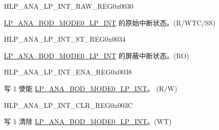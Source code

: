 \begin{register}{H}{LP\_ANA\_LP\_INT\_RAW\_REG}{0x0030}\label{regdesc:LPANALPINTRAWREG}
%
%
\regnewline%
\begin{regdesc}\begin{reglist}
\label{fielddesc:LPANABODMODE0LPINTRAW}\item [LP\_ANA\_BOD\_MODE0\_LP\_INT\_RAW] \hyperref[int:LPANABODMODE0LPINT]{LP\_ANA\_BOD\_MODE0\_LP\_INT} 的原始中断状态。(R/WTC/SS)
\end{reglist}\end{regdesc}
\end{register}

\begin{register}{H}{LP\_ANA\_LP\_INT\_ST\_REG}{0x0034}\label{regdesc:LPANALPINTSTREG}
%
%
\regnewline%
\begin{regdesc}\begin{reglist}
\label{fielddesc:LPANABODMODE0LPINTST}\item [LP\_ANA\_BOD\_MODE0\_LP\_INT\_ST] \hyperref[int:LPANABODMODE0LPINT]{LP\_ANA\_BOD\_MODE0\_LP\_INT} 的屏蔽中断状态。(RO)
\end{reglist}\end{regdesc}
\end{register}

\begin{register}{H}{LP\_ANA\_LP\_INT\_ENA\_REG}{0x0038}\label{regdesc:LPANALPINTENAREG}
%
%
\regnewline%
\begin{regdesc}\begin{reglist}
\label{fielddesc:LPANABODMODE0LPINTENA}\item [LP\_ANA\_BOD\_MODE0\_LP\_INT\_ENA] 写 1 使能 \hyperref[int:LPANABODMODE0LPINT]{LP\_ANA\_BOD\_MODE0\_LP\_INT}。
(R/W)
\end{reglist}\end{regdesc}
\end{register}

\begin{register}{H}{LP\_ANA\_LP\_INT\_CLR\_REG}{0x003C}\label{regdesc:LPANALPINTCLRREG}
%
%
\regnewline%
\begin{regdesc}\begin{reglist}
\label{fielddesc:LPANABODMODE0LPINTCLR}\item [LP\_ANA\_BOD\_MODE0\_LP\_INT\_CLR] 写 1 清除 \hyperref[int:LPANABODMODE0LPINT]{LP\_ANA\_BOD\_MODE0\_LP\_INT}。(WT)
\end{reglist}\end{regdesc}
\end{register}

